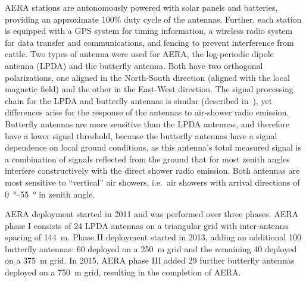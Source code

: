 AERA stations are autonomously powered with solar panels and batteries, providing an approximate 100\% duty cycle of the antennas.
Further, each station is equipped with a GPS system for timing information, a wireless radio system for data transfer and communications, and fencing to prevent interference from cattle.
Two types of antenna were used for AERA, the log-periodic dipole antenna (LPDA) and the butterfly antenna.
Both have two orthogonal polarizations, one aligned in the North-South direction (aligned with the local magnetic field) and the other in the East-West direction.
The signal processing chain for the LPDA and butterfly antennas is similar (described in~\cite{auger_jinst2012_aera}), yet differences arise for the response of the antennas to air-shower radio emission.
Butterfly antennas are more sensitive than the LPDA antennas, and therefore have a lower signal threshold, because the butterfly antennas have a signal dependence on local ground conditions, as this antenna's total measured signal is a combination of signals reflected from the ground that for most zenith angles interfere constructively with the direct shower radio emission.
Both antennas are most sensitive to ``vertical'' air showers, i.e.~air showers with arrival directions of \qtyrange{0}{55}{\degree} in zenith angle.


AERA deployment started in 2011 and was performed over three phases.
AERA phase I consists of 24 LPDA antennas on a triangular grid with inter-antenna spacing of \qty{144}{\meter}.
Phase II deployment started in 2013, adding an additional 100 butterfly antennas: 60 deployed on a \qty{250}{\meter} grid and the remaining 40 deployed on a \qty{375}{\meter} grid.
In 2015, AERA phase III added 29 further butterfly antennas deployed on a \qty{750}{\meter} grid, resulting in the completion of AERA.

